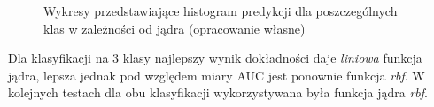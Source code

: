 \documentclass[a4paper, twoside, 11pt, openright]{article}
\begin{document}
\begin{figure}[H]%
\centering
{}%
\qquad
{}%

\caption{Wykresy przedstawiające histogram predykcji dla poszczególnych klas w zależności od jądra (opracowanie własne)}
\label{img:svm_kernel_histograms}
\end{figure}

Dla klasyfikacji na 3 klasy najlepszy wynik dokładności daje \textit{liniowa} funkcja jądra, lepsza jednak pod względem miary AUC jest ponownie funkcja \textit{rbf}. W kolejnych testach dla obu klasyfikacji wykorzystywana była funkcja jądra \textit{rbf}.
\end{document}
